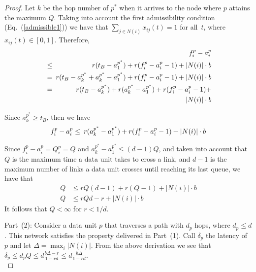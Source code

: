\documentclass[journal,twocolumn]{./IEEEtran}
\begin{document}
\begin{proof}
Let $k$ be the hop number of $p^*$ when it arrives to the node where $p$ attains the maximum $Q$. Taking into account the first admissibility condition (Eq.~(\ref{admissible1})) we have that  $\sum_{j \in N(i)} x_{ij}(t) = 1$ for all~$t$, where $x_{ij}(t) \in [0,1]$. Therefore, 
\begin{eqnarray*}
&& f_i^p - a_i^p  \\
&\leq& 
\hspace*{-0.5em} r (t_B - a_1^{p^*})  + r (f_i^p - a_i^p -1)  + |N(i)|\cdot b  \\
&=& 
\hspace*{-0.5em} r (t_B - a_k^{p^*} + a_k^{p^*} - a_1^{p^*})  + r (f_i^p - a_i^p -1)  + |N(i)|\cdot b  \\
&=& 
\hspace*{-0.5em} r (t_B - a_k^{p^*}) + r (a_k^{p^*} - a_1^{p^*})  + r (f_i^p - a_i^p -1)  + \\
&& \hspace*{-0.5em} |N(i)|\cdot b
\end{eqnarray*}

Since $a_k^{p^*} \geq t_B$, then we have
\begin{eqnarray*}
f_i^p - a_i^p &\leq& 
\hspace*{-0.5em} r (a_k^{p^*} - a_1^{p^*})  + r (f_i^p - a_i^p -1)  + |N(i)|\cdot b  
\end{eqnarray*}


Since  $f_i^p - a_i^p=Q_i^p=Q$ and $a_k^{p^*}-a_1^{p^*} \leq (d-1)Q$,
and taken into account that $Q$ is the maximum time a data unit takes to cross a link, and $d-1$ is the maximum number of links a data unit crosses until reaching its last queue, we have that
\begin{equation}
\nonumber
\begin{split}
Q  &  \leq r Q (d-1) + r (Q -1)  + |N(i)|\cdot b  \\
Q & \leq r Q  d -r + |N(i)|\cdot b
\end{split}
\end{equation}
It follows that $Q < \infty$ for $r < 1/d$.


Part~(2): Consider a data unit $p$ that traverses a path with $d_p$ hops, where $d_p \leq d$. This network satisfies the 
property delivered in
Part~(1). 
Call $\delta_p$ 
the 
latency
of~$p$ and let $\Delta = \max_i |N(i)|$. 
From the above derivation we see that 
$\delta_p \leq d_p Q \leq d \frac{b \Delta -r}{1-r d} \leq  d \frac{b \Delta}{1-r d}$. \\
\end{proof}
\end{document}
